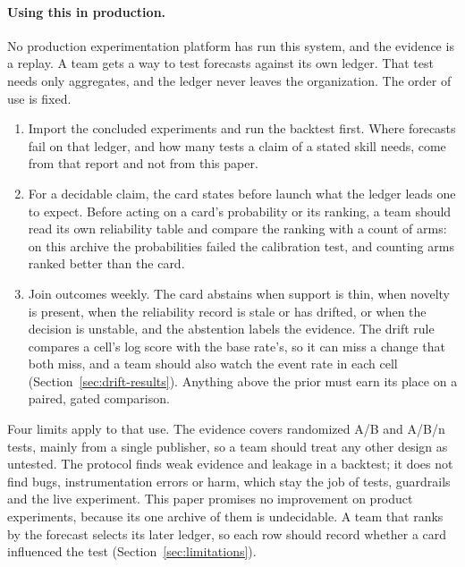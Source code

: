 \paragraph{Using this in production.} No production experimentation platform has run this system, and the evidence is a replay. A team gets a way to test forecasts against its own ledger. That test needs only aggregates, and the ledger never leaves the organization. The order of use is fixed.
\begin{enumerate}
\item Import the concluded experiments and run the backtest first. Where forecasts fail on that ledger, and how many tests a claim of a stated skill needs, come from that report and not from this paper.
\item For a decidable claim, the card states before launch what the ledger leads one to expect. Before acting on a card's probability or its ranking, a team should read its own reliability table and compare the ranking with a count of arms: on this archive the probabilities failed the calibration test, and counting arms ranked better than the card.
\item Join outcomes weekly. The card abstains when support is thin, when novelty is present, when the reliability record is stale or has drifted, or when the decision is unstable, and the abstention labels the evidence. The drift rule compares a cell's log score with the base rate's, so it can miss a change that both miss, and a team should also watch the event rate in each cell (Section~\ref{sec:drift-results}). Anything above the prior must earn its place on a paired, gated comparison.
\end{enumerate}
Four limits apply to that use. The evidence covers randomized A/B and A/B/n tests, mainly from a single publisher, so a team should treat any other design as untested. The protocol finds weak evidence and leakage in a backtest; it does not find bugs, instrumentation errors or harm, which stay the job of tests, guardrails and the live experiment. This paper promises no improvement on product experiments, because its one archive of them is undecidable. A team that ranks by the forecast selects its later ledger, so each row should record whether a card influenced the test (Section~\ref{sec:limitations}).
